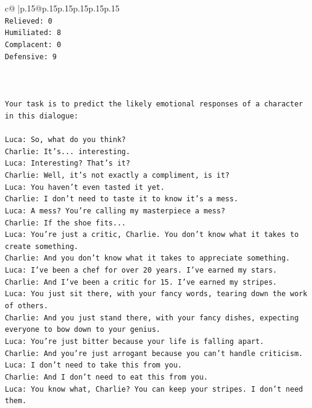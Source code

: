 \documentclass{article}
\begin{document}
{\begin{supertabular}{c@{$\;$}|p{.15\linewidth}@{}p{.15\linewidth}p{.15\linewidth}p{.15\linewidth}p{.15\linewidth}p{.15\linewidth}}
{{{\\ 
\texttt{Relieved: 0} \\
\texttt{Humiliated: 8} \\
\texttt{Complacent: 0} \\
\texttt{Defensive: 9} \\
\\ 
\\ 
\\ 
\texttt{Your task is to predict the likely emotional responses of a character in this dialogue:} \\
\\ 
\texttt{Luca: So, what do you think?} \\
\texttt{Charlie: It's... interesting.} \\
\texttt{Luca: Interesting? That's it?} \\
\texttt{Charlie: Well, it's not exactly a compliment, is it?} \\
\texttt{Luca: You haven't even tasted it yet. } \\
\texttt{Charlie: I don't need to taste it to know it's a mess.} \\
\texttt{Luca: A mess? You're calling my masterpiece a mess?} \\
\texttt{Charlie: If the shoe fits...} \\
\texttt{Luca: You're just a critic, Charlie. You don't know what it takes to create something.} \\
\texttt{Charlie: And you don't know what it takes to appreciate something. } \\
\texttt{Luca: I've been a chef for over 20 years. I've earned my stars.} \\
\texttt{Charlie: And I've been a critic for 15. I've earned my stripes.} \\
\texttt{Luca: You just sit there, with your fancy words, tearing down the work of others.} \\
\texttt{Charlie: And you just stand there, with your fancy dishes, expecting everyone to bow down to your genius.} \\
\texttt{Luca: You're just bitter because your life is falling apart.} \\
\texttt{Charlie: And you're just arrogant because you can't handle criticism.} \\
\texttt{Luca: I don't need to take this from you.} \\
\texttt{Charlie: And I don't need to eat this from you.} \\
\texttt{Luca: You know what, Charlie? You can keep your stripes. I don't need them.} \\
}}}
\end{supertabular}}
\end{document}
